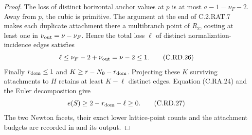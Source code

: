\begin{proof}
The loss of distinct horizontal anchor values
at $p$ is at most $a-1=\nu_F-2$. Away from
$p$, the cubic is primitive. The argument at
the end of C.2.RAT.7 makes each duplicate
attachment there a multibranch point of $R_2$,
costing at least one in
$\nu_{\rm out}=\nu-\nu_F$. Hence the total
loss $\ell$ of distinct normalization-incidence
edges satisfies
\[
                    \ell\le\nu_F-2+\nu_{\rm out}
                              =\nu-2\le1.
\tag{C.RD.26}
\]
Finally $r_{\rm dom}\le1$ and
$K\ge r-N_0-r_{\rm dom}$. Projecting these
$K$ surviving attachments to $H$ retains at
least $K-\ell$ distinct edges. Equation
(C.RA.24) and the Euler decomposition give
\[
                 e(S)\ge2-r_{\rm dom}-\ell\ge0.
\tag{C.RD.27}
\]
The two Newton facets, their exact lower
lattice-point counts and the attachment
budgets are recorded in
 and its output.
\end{proof}


